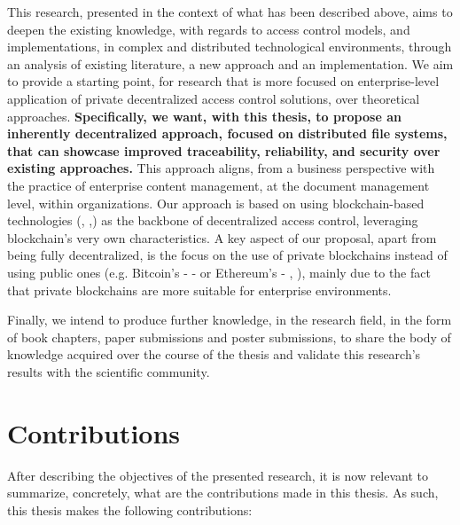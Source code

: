 This research, presented in the context of what has been described above, aims to deepen the existing knowledge, with regards to access control models, and implementations, in complex and distributed technological environments, through an analysis of existing literature, a new approach and an implementation. We aim to provide a starting point, for research that is more focused on enterprise-level application of private decentralized access control solutions, over theoretical approaches. \textbf{Specifically, we want, with this thesis, to propose an inherently decentralized approach, focused on distributed file systems, that can showcase improved traceability, reliability, and security over existing approaches.} This approach aligns, from a business perspective with the practice of enterprise content management, at the document management level, within organizations. Our approach is based on using blockchain-based technologies (\cite{nakamoto_bitcoin:_2008}, \cite{buterin_next-generation_2013},\cite{wood_ethereum:_2014}) as the backbone of decentralized access control, leveraging blockchain's very own characteristics. A key aspect of our proposal, apart from being fully decentralized, is the focus on the use of private blockchains instead of using public ones (e.g. Bitcoin's - \cite{nakamoto_bitcoin:_2008} - or Ethereum's - \cite{buterin_next-generation_2013}, \cite{wood_ethereum:_2014}), mainly due to the fact that private blockchains are more suitable for enterprise environments.

Finally, we intend to produce further knowledge, in the research field, in the form of book chapters, paper submissions and poster submissions, to share the body of knowledge acquired over the course of the thesis and validate this research's results with the scientific community.

\section{Contributions}
\label{sec:contributions}

After describing the objectives of the presented research, it is now relevant to summarize, concretely, what are the contributions made in this thesis. As such, this thesis makes the following contributions:

